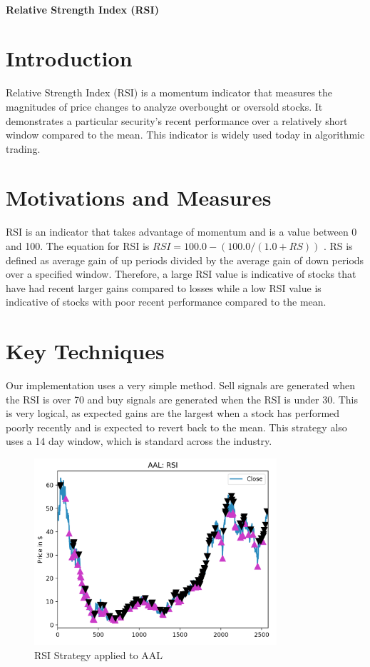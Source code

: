 \documentclass[letterpaper,11pt]{article}
\begin{document}
\thispagestyle{plain}


 \\

\noindent\textbf{Relative Strength Index (RSI)}

\section*{Introduction }

Relative Strength Index (RSI) is a momentum indicator that measures the magnitudes of price changes to analyze overbought or oversold stocks. It demonstrates a particular security's recent performance over a relatively short window compared to the mean. This indicator is widely used today in algorithmic trading. 

\section*{Motivations and Measures}
RSI is an indicator that takes advantage of momentum and is a value between 0 and 100. The equation for RSI is $RSI = 100.0 - (100.0 / (1.0 + RS))$ \cite{Chong2014}. RS is defined as average gain of up periods divided by the average gain of down periods over a specified window. Therefore, a large RSI value is indicative of stocks that have had recent larger gains compared to losses while a low RSI value is indicative of stocks with poor recent performance compared to the mean.

\section*{Key Techniques}
Our implementation uses a very simple method. Sell signals are generated when the RSI is over 70 and buy signals are generated when the RSI is under 30. This is very logical, as expected gains are the largest when a stock has performed poorly recently and is expected to revert back to the mean. This strategy also uses a 14 day window, which is standard across the industry. 

\begin{figure}[ht!]
\centering
\includegraphics[width=90mm]{AAL_RSI_signals.png}
\caption{RSI Strategy applied to AAL\label{overflow}}
\end{figure}
\end{document}
